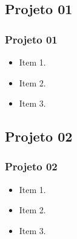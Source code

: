 \subsection[Projeto 01]{Projeto 01}\label{subsec:projetos-projeto01}



\begin{frame}[t]\frametitle{Projeto 01}

  \begin{itemize}
    \justifying{}
    \setlength\itemsep{1em}
    \item Item 1.
    \item Item 2.
    \item Item 3.
  \end{itemize}

\end{frame}



\subsection[Projeto 02]{Projeto 02}\label{subsec:projetos-projeto02}



\begin{frame}[t]\frametitle{Projeto 02}

  \begin{itemize}
    \justifying{}
    \setlength\itemsep{1em}
    \item Item 1.
    \item Item 2.
    \item Item 3.
  \end{itemize}

\end{frame}
